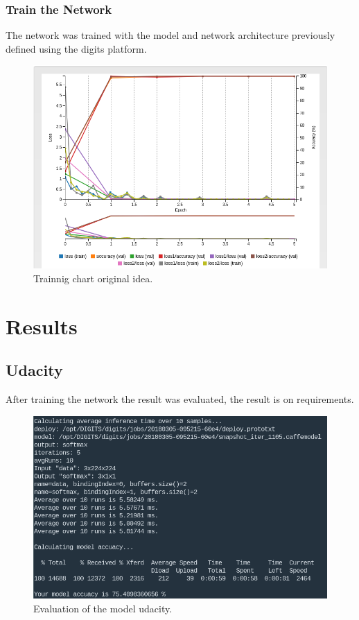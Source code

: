 \documentclass[10pt,journal,compsoc]{IEEEtran}
\begin{document}
\subsubsection{Train the Network}

The network was trained with the model and network architecture previously defined using the digits platform.

\begin{figure}[h]
\centering
\includegraphics[scale=0.3]{trainning-chart-udacity}
\caption{Trainnig chart original idea.}
\label{fig:figure3}
\end{figure}

\section{Results}

\subsection{Udacity}

After training the network the result was evaluated, the result is on requirements.

\begin{figure}[h]
\centering
\includegraphics[scale=0.2]{udacity-evaluate}
\caption{Evaluation of the model udacity.}
\label{fig:figure4}
\end{figure}
\end{document}
